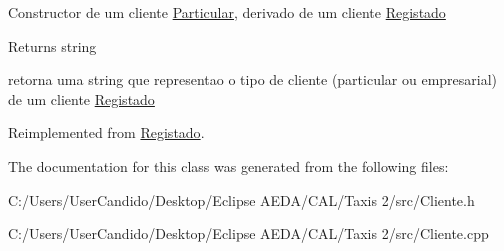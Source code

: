 Constructor de um cliente \hyperlink{class_particular}{Particular}, derivado de um cliente \hyperlink{class_registado}{Registado}

\begin{DoxyReturn}{Returns}
string
\end{DoxyReturn}
retorna uma string que representao o tipo de cliente (particular ou empresarial) de um cliente \hyperlink{class_registado}{Registado} 

Reimplemented from \hyperlink{class_registado}{Registado}.



The documentation for this class was generated from the following files\+:\begin{DoxyCompactItemize}
\item 
C\+:/\+Users/\+User\+Candido/\+Desktop/\+Eclipse A\+E\+D\+A/\+C\+A\+L/\+Taxis 2/src/Cliente.\+h\item 
C\+:/\+Users/\+User\+Candido/\+Desktop/\+Eclipse A\+E\+D\+A/\+C\+A\+L/\+Taxis 2/src/Cliente.\+cpp\end{DoxyCompactItemize}
